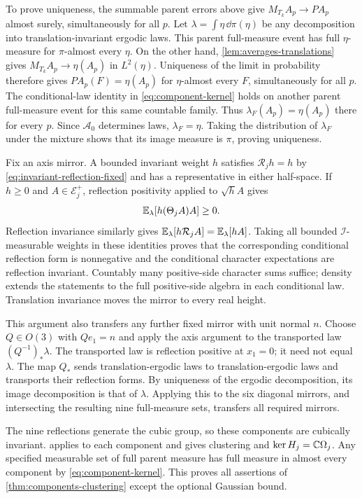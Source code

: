 To prove uniqueness, the summable parent errors above give
$M_{T_k}A_p\to PA_p$ almost surely, simultaneously for all $p$.
Let $\lambda=\int\eta\,\dd\pi(\eta)$ be any decomposition into
translation-invariant ergodic laws. This parent full-measure event
has full $\eta$-measure for $\pi$-almost every $\eta$.
On the other hand, \cref{lem:averages-translations} gives
$M_{T_k}A_p\to\eta(A_p)$ in $L^2(\eta)$.
Uniqueness of the limit in probability therefore gives
$PA_p(F)=\eta(A_p)$ for $\eta$-almost every $F$, simultaneously
for all $p$. The conditional-law identity in
\eqref{eq:component-kernel} holds on another parent full-measure
event for this same countable family. Thus
$\lambda_F(A_p)=\eta(A_p)$ there for every $p$.
Since $\mathcal A_0$ determines laws, $\lambda_F=\eta$.
Taking the distribution of $\lambda_F$ under the mixture shows
that its image measure is $\pi$, proving uniqueness.

Fix an axis mirror. A bounded invariant weight $h$ satisfies
$\mathcal R_jh=h$ by \eqref{eq:invariant-reflection-fixed} and has a
representative in either half-space. If $h\ge0$ and
$A\in\mathcal E_j^+$, reflection positivity applied to $\sqrt hA$
gives
\begin{equation}\label{eq:weighted-component-rp}
 \mathbb E_\lambda[h(\Theta_jA)A]\ge0.
\end{equation}
Reflection invariance similarly gives
$\mathbb E_\lambda[h\mathcal R_jA]=\mathbb E_\lambda[hA]$.
Taking all bounded $\mathcal I$-measurable weights in these identities
proves that the corresponding conditional reflection form is
nonnegative and the conditional character expectations are reflection
invariant. Countably many positive-side character sums suffice;
density extends the statements to the full positive-side algebra
in each conditional law. Translation invariance moves the mirror
to every real height.

This argument also transfers any further fixed mirror with unit normal $n$.
Choose $Q\in O(3)$ with $Qe_1=n$ and apply the axis argument to
the transported law $(Q^{-1})_*\lambda$. The transported law is
reflection positive at $x_1=0$; it need not equal $\lambda$.
The map $Q_*$ sends translation-ergodic laws to translation-ergodic
laws and transports their reflection forms. By uniqueness of the
ergodic decomposition, its image decomposition is that of $\lambda$.
Applying this to the six diagonal mirrors, and intersecting the
resulting nine full-measure sets, transfers all required mirrors.

The nine reflections generate the cubic group, so these components
are cubically invariant.  applies
to each component and gives clustering and
$\ker H_j=\mathbb C\Omega_j$. Any specified measurable set of full parent
measure has full measure in almost every component by
\eqref{eq:component-kernel}. This proves all assertions of
\cref{thm:components-clustering} except the optional Gaussian bound.

